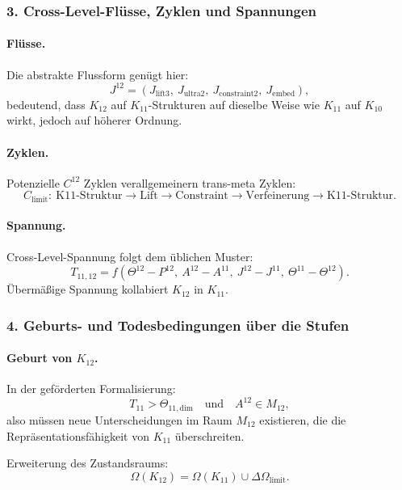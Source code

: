 \subsubsection{3. Cross-Level-Flüsse, Zyklen und Spannungen}

\paragraph{Flüsse.}
Die abstrakte Flussform genügt hier:
\[
J^{12} = (J_{\mathrm{lift3}},\ J_{\mathrm{ultra2}},\
          J_{\mathrm{constraint2}},\ J_{\mathrm{embed}}),
\]
bedeutend, dass $K_{12}$ auf $K_{11}$-Strukturen auf dieselbe Weise wie $K_{11}$
auf $K_{10}$ wirkt, jedoch auf höherer Ordnung.

\paragraph{Zyklen.}
Potenzielle $C^{12}$ Zyklen verallgemeinern trans-meta Zyklen:
\[
C_{\mathrm{limit}}:\
\text{K11-Struktur} \rightarrow \text{Lift} \rightarrow
\text{Constraint} \rightarrow \text{Verfeinerung} \rightarrow \text{K11-Struktur}.
\]

\paragraph{Spannung.}
Cross-Level-Spannung folgt dem üblichen Muster:
\[
T_{11,12} =
f(\Theta^{12} - P^{12},\ A^{12} - A^{11},\
  J^{12} - J^{11},\ \Theta^{11} - \Theta^{12}).
\]
Übermäßige Spannung kollabiert $K_{12}$ in $K_{11}$.

\subsubsection{4. Geburts- und Todesbedingungen über die Stufen}

\paragraph{Geburt von $K_{12}$.}
In der geförderten Formalisierung:
\[
T_{11} > \Theta_{11,\mathrm{dim}}
\quad\text{und}\quad
A^{12} \in M_{12},
\]
also müssen neue Unterscheidungen im Raum $M_{12}$ existieren, die die
Repräsentationsfähigkeit von $K_{11}$ überschreiten.

Erweiterung des Zustandsraums:
\[
\Omega(K_{12}) = \Omega(K_{11}) \cup \Delta\Omega_{\mathrm{limit}}.
\]

